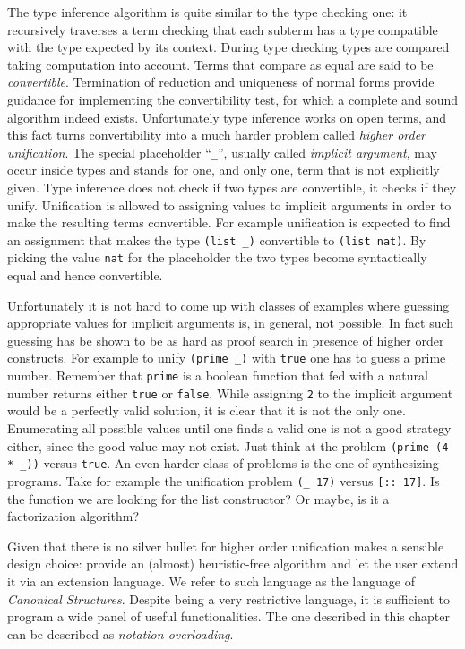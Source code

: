 The type inference algorithm is quite similar to the type checking
one: it recursively traverses a term checking that each subterm has a
type compatible with the type expected by its context.  During type
checking types are compared taking computation into account.  Terms
that compare as equal are said to be \emph{convertible}.
Termination of reduction and uniqueness of normal forms provide
guidance for implementing the convertibility test, for which a
complete and sound algorithm indeed exists.  Unfortunately type
inference works on open terms, and this fact turns convertibility into
a much harder problem called \emph{higher order unification}.  The
special placeholder ``\lstinline/_/'', usually called \emph{implicit
argument}, may occur inside types and stands for one, and only one,
term that is not explicitly given.  Type inference does not check if
two types are convertible, it checks if they unify.
Unification is allowed to assigning values to implicit arguments in order
to make the resulting terms convertible.  For example unification is
expected to find an assignment that makes the type
\lstinline/(list _)/ convertible to \lstinline/(list nat)/.
By picking the value \lstinline/nat/ for the placeholder
the two types become syntactically equal and hence convertible.

Unfortunately it is not hard to come up with classes of examples where
guessing appropriate values for implicit arguments is, in general, not
possible. In fact such guessing has be shown to be as hard as proof
search in presence of higher order constructs.
For example to unify \lstinline/(prime _)/ with
\lstinline/true/ one has to guess a prime number. Remember that
\lstinline/prime/ is a boolean function that fed with a natural
number returns either \lstinline/true/ or \lstinline/false/.
While assigning \lstinline/2/ to the implicit argument
would be a perfectly valid solution, it is clear
that it is not the only one.  Enumerating all possible
values until one finds a valid one is not a good strategy
either, since the good value may not exist.  Just think at the
problem \lstinline/(prime (4 * _))/ versus \lstinline/true/.  An even
harder class of problems is the one of synthesizing programs.
Take for example the unification problem \lstinline/(_ 17)/ versus
\lstinline/[:: 17]/.  Is the function we are looking for the list
constructor? Or maybe, is it a factorization algorithm?

Given that there is no silver bullet for higher order unification
\Coq{} makes a sensible design choice: provide an (almost)
heuristic-free algorithm and let the user extend it via an extension
language.  We refer to such language as the language of
\emph{Canonical Structures}.  Despite being a very restrictive language,
it is sufficient to program a wide panel of useful functionalities.  The
one described in this chapter can be described as \emph{notation
overloading}.

